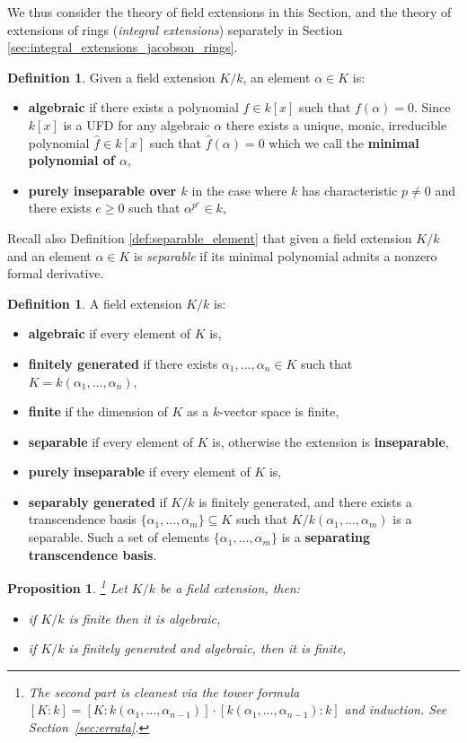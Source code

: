 \documentclass[12pt]{article}
\theoremstyle{plain}
\newtheorem{proposition}[thm]{Proposition}
\theoremstyle{definition}
\newtheorem{defn}[thm]{Definition} %
\begin{document}
We thus consider the theory of field extensions in this Section, and the theory of extensions of rings (\emph{integral extensions}) separately in Section \ref{sec:integral_extensions_jacobson_rings}.
\begin{defn}
Given a field extension $K/k$, an element $\alpha \in K$ is:
\begin{itemize}
    \item \textbf{algebraic} if there exists a polynomial $f \in k[x]$ such that $f(\alpha) = 0$. Since $k[x]$ is a UFD for any algebraic $\alpha$ there exists a unique, monic, irreducible polynomial $\hat{f} \in k[x]$ such that $\hat{f}(\alpha) = 0$ which we call the \textbf{minimal polynomial of $\alpha$},
    \item \textbf{purely inseparable over $k$} in the case where $k$ has characteristic $p \neq 0$ and there exists $e \geq 0$ such that $\alpha^{p^e} \in k$,
\end{itemize}
\end{defn}
Recall also Definition \ref{def:separable_element} that given a field extension $K/k$ and an element $\alpha \in K$ is \emph{separable} if its minimal polynomial admits a nonzero formal derivative.
\begin{defn}
A field extension $K/k$ is:
\begin{itemize}
    \item \textbf{algebraic} if every element of $K$ is,
    \item \textbf{finitely generated} if there exists $\alpha_1,...,\alpha_n \in K$ such that $K = k(\alpha_1,...,\alpha_n)$,
    \item \textbf{finite} if the dimension of $K$ as a $k$-vector space is finite,
    \item \textbf{separable} if every element of $K$ is, otherwise the extension is \textbf{inseparable},
    \item \textbf{purely inseparable} if every element of $K$ is,
    \item \textbf{separably generated} if $K/k$ is finitely generated, and there exists a transcendence basis $\lbrace \alpha_1,...,\alpha_m\rbrace \subseteq K$ such that $K/k(\alpha_1,...,\alpha_m)$ is a separable. Such a set of elements $\lbrace \alpha_1,...,\alpha_m\rbrace$ is a \textbf{separating transcendence basis}.
\end{itemize}
\end{defn}
\begin{proposition}\label{prop:extension_relations}\footnote{The second part is cleanest via the tower formula $[K:k]=[K:k(\alpha_1,\ldots,\alpha_{n-1})]\cdot[k(\alpha_1,\ldots,\alpha_{n-1}):k]$ and induction. See Section~\ref{sec:errata}.}
Let $K/k$ be a field extension, then:
\begin{itemize}
    \item if $K/k$ is finite then it is algebraic,
    \item if $K/k$ is finitely generated and algebraic, then it is finite,
\end{itemize}
\end{proposition}
\end{document}

